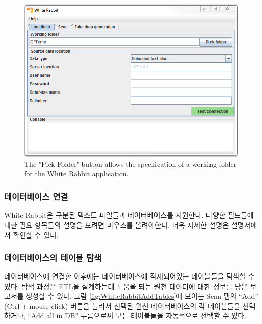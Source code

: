 \documentclass[11pt]{book}
\theoremstyle{definition}
\theoremstyle{definition}
\theoremstyle{definition}
\theoremstyle{remark}
\begin{document}
\begin{figure}

{\centering \includegraphics[width=1\linewidth]{images/ExtractTransformLoad/WhiteRabbitLocation} 

}

\caption{The "Pick Folder" button allows the specification of a working folder for the White Rabbit application.}\label{fig:WhiteRabbitLocation}
\end{figure}

\subsubsection*{데이터베이스 연결}\label{-}

White Rabbit은 구분된 텍스트 파일들과 데이터베이스를 지원한다. 다양한
필드들에 대한 필요 항목들의 설명을 보려면 마우스를 올려야한다. 더욱
자세한 설명은 설명서에서 확인할 수 있다.

\subsubsection*{데이터베이스의 테이블 탐색}\label{--}

데이터베이스에 연결한 이후에는 데이터베이스에 적재되어있는 테이블들을
탐색할 수 있다. 탐색 과정은 ETL을 설계하는데 도움을 되는 원천 데이터에
대한 정보를 담은 보고서를 생성할 수 있다. 그림
\ref{fig:WhiteRabbitAddTables}에 보이는 Scan 탭의 ``Add'' (Ctrl + mouse
click) 버튼을 눌러서 선택된 원천 데이터베이스의 각 테이블들을
선택하거나, ``Add all in DB'' 누름으로써 모든 테이블들을 자동적으로
선택할 수 있다.
\end{document}
